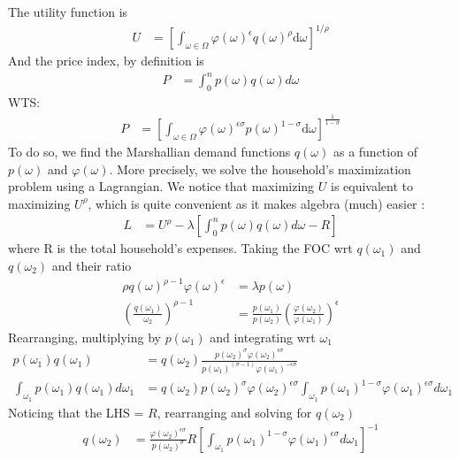 \documentclass[10pt, final]{article}
\begin{document}
\begin{enumerate}[1.]
	The utility function is
	\begin{align*}
		U &= \left[\int_{\omega\in\Omega} \varphi(\omega)^{\epsilon} q(\omega)^{\rho}\textrm{d}\omega\right]^{1/\rho}
	\end{align*}
	And the price index, by definition is 
	\begin{align*}
		P &= \int_0^{n}p(\omega) q(\omega) d\omega
	\end{align*}
	WTS:
	\begin{align*}
		P &= \left[ \int_{\omega\in\Omega} \varphi(\omega)^{\epsilon\sigma} p(\omega)^{1-\sigma} \textrm{d} \omega \right]^{\frac{1}{1-\sigma}}
	\end{align*}
	To do so, we find the Marshallian demand functions $q(\omega)$ as a function of $p(\omega)$ and $\varphi(\omega)$. More precisely, we solve the household's maximization problem using a Lagrangian. We notice that maximizing $U$ is equivalent to maximizing $U^\rho$, which is quite convenient as it makes algebra (much) easier :
	\begin{align*}
		L &= U^\rho - \lambda[\int_0^{n}p(\omega) q(\omega) d\omega - R]
	\end{align*}
	where R is the total household's expenses. Taking the FOC wrt $q(\omega_1)$ and $q(\omega_2)$ and their ratio
	\begin{align*}
		\rho q(\omega)^{\rho -1} \varphi(\omega)^\epsilon &= \lambda p(\omega) \\
		(\frac{q(\omega_1)}{\omega_2})^{\rho - 1} &= \frac{p(\omega_1)}{p(\omega_2)} (\frac{\varphi(\omega_2)}{\varphi(\omega_1)})^{\epsilon}
	\end{align*}
	Rearranging, multiplying by $p(\omega_1)$ and integrating wrt $\omega_1$
	\begin{align*}
		p(\omega_1) q(\omega_1) &= q(\omega_2) \frac{p(\omega_2)^\sigma \varphi(\omega_2)^{\epsilon \sigma}}{p(\omega_1)^(\sigma-1) \varphi(\omega_1)^{-\epsilon \sigma}} \\
		\int_{\omega_1} p(\omega_1) q(\omega_1) d \omega_1 &= q(\omega_2) p(\omega_2)^\sigma \varphi(\omega_2)^{\epsilon \sigma} \int_{\omega_1} p(\omega_1)^{1-\sigma} \varphi(\omega_1)^{\epsilon \sigma} d \omega_1
	\end{align*}
	Noticing that the LHS = $R$, rearranging and solving for $q(\omega_2)$
	\begin{align*}
		q(\omega_2) &= \frac{\varphi(\omega_2)^{\epsilon \sigma}}{p(\omega_2)^\sigma} R [\int_{\omega_1} p(\omega_1)^{1-\sigma} \varphi(\omega_1)^{\epsilon \sigma} d \omega_1]^{-1}
	\end{align*}

\end{enumerate}
\end{document}
